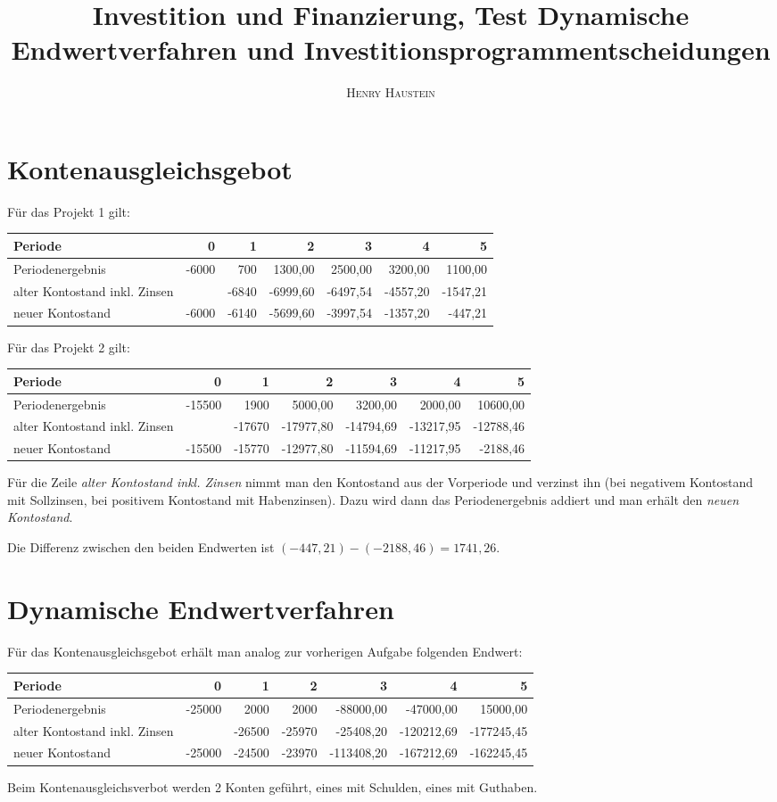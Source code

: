 \documentclass{article}
\title{\textbf{Investition und Finanzierung, Test Dynamische Endwertverfahren und Investitionsprogrammentscheidungen}}
\author{\textsc{Henry Haustein}}
\date{}
\begin{document}
	\maketitle
	
	\section*{Kontenausgleichsgebot}
	Für das Projekt 1 gilt:
	\begin{center}
		\begin{tabular}{l|r|r|r|r|r|r}
			Periode & 0 & 1 & 2 & 3 & 4 & 5 \\
			\hline
			Periodenergebnis & -6000 & 700 & 1300,00 & 2500,00 & 3200,00 & 1100,00 \\
			\hline
			alter Kontostand inkl. Zinsen & & -6840 & -6999,60 & -6497,54 & -4557,20 & -1547,21 \\
			\hline
			neuer Kontostand & -6000 & -6140 & -5699,60 & -3997,54 & -1357,20 & -447,21
		\end{tabular}
	\end{center}
	Für das Projekt 2 gilt:
	\begin{center}
		\begin{tabular}{l|r|r|r|r|r|r}
			Periode & 0 & 1 & 2 & 3 & 4 & 5 \\
			\hline
			Periodenergebnis & -15500 & 1900 & 5000,00 & 3200,00 & 2000,00 & 10600,00 \\
			\hline
			alter Kontostand inkl. Zinsen & & -17670 & -17977,80 & -14794,69 & -13217,95 & -12788,46 \\
			\hline
			neuer Kontostand & -15500 & -15770 & -12977,80 & -11594,69 & -11217,95 & -2188,46
		\end{tabular}
	\end{center}
	Für die Zeile \textit{alter Kontostand inkl. Zinsen} nimmt man den Kontostand aus der Vorperiode und verzinst ihn (bei negativem Kontostand mit Sollzinsen, bei positivem Kontostand mit Habenzinsen). Dazu wird dann das Periodenergebnis addiert und man erhält den \textit{neuen Kontostand}.
	
	Die Differenz zwischen den beiden Endwerten ist $(-447,21) - (-2188,46) = 1741,26$.
	
	\section*{Dynamische Endwertverfahren}
	Für das Kontenausgleichsgebot erhält man analog zur vorherigen Aufgabe folgenden Endwert:
	\begin{center}
		\begin{tabular}{l|r|r|r|r|r|r}
			Periode & 0 & 1 & 2 & 3 & 4 & 5 \\
			\hline
			Periodenergebnis & -25000 & 2000 & 2000 & -88000,00 & -47000,00 & 15000,00 \\
			\hline
			alter Kontostand inkl. Zinsen & & -26500 & -25970 & -25408,20 & -120212,69 & -177245,45 \\
			\hline
			neuer Kontostand & -25000 & -24500 & -23970 & -113408,20 & -167212,69 & -162245,45
		\end{tabular}
	\end{center}
	Beim Kontenausgleichsverbot werden 2 Konten geführt, eines mit Schulden, eines mit Guthaben.
	
\end{document}
